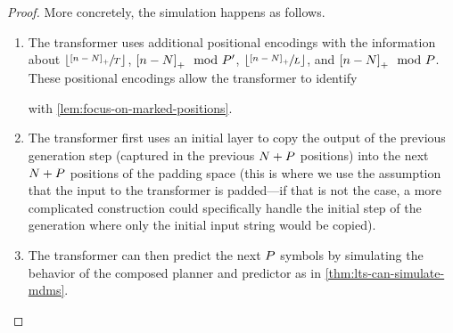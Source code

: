 \begin{proof}
   More concretely, the simulation happens as follows.
   \begin{enumerate}[label=(\arabic*)]
      \item The \pCoTAcr transformer uses additional positional encodings with the information about ${\left\lfloor \sfrac{{\left[ {{n}} - {{N}} \right]_{+}}}{{T}} \right\rfloor}$, ${\left[ {{n}} - {{N}} \right]_{+}} \mod {{P}}'$, ${\left\lfloor \sfrac{{\left[ {{n}} - {{N}} \right]_{+}}}{{{L}}} \right\rfloor}$, and ${\left[ {{n}} - {{N}} \right]_{+}} \mod {{P}}$.
      These positional encodings allow the \pCoTAcr transformer to identify 
      with \cref{lem:focus-on-marked-positions}.
      \item The \pCoTAcr transformer first uses an initial layer to copy the output of the previous generation step (captured in the previous ${{N}} + {P}$ positions) into the next ${{N}} + {P}$ positions of the padding space (this is where we use the assumption that the input to the \pCoTAcr transformer is padded---if that is not the case, a more complicated construction could specifically handle the initial step of the generation where only the initial input string would be copied).
      \item The \pCoTAcr transformer can then predict the next ${P}$ symbols by simulating the behavior of the composed \eMDMAcr planner and predictor as in \cref{thm:lts-can-simulate-mdms}.
   \end{enumerate}
\end{proof}
